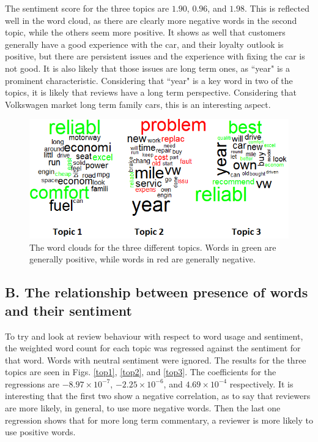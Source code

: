 \documentclass[onecolumn,prl,aps,10pt]{revtex4}
\begin{document}
The sentiment score for the three topics are $1.90$, $0.96$, and $1.98$. This is reflected well in the word cloud, as there are clearly more negative words in the second topic, while the others seem more positive. It shows as well that customers generally have a good experience with the car, and their loyalty outlook is positive, but there are persistent issues and the experience with fixing the car is not good. It is also likely that those issues are long term ones, as \textquotedblleft year" is a prominent characteristic. Considering that \textquotedblleft year" is a key word in two of the topics, it is likely that reviews have a long term perspective. Considering that Volkswagen market long term family cars, this is an interesting aspect.

\begin{figure}
\includegraphics*[clip]{all_clouds.png}
\caption{The word clouds for the three different topics. Words in green are generally positive, while words in red are generally negative.} \label{clouds}
\end{figure}


\subsection{B. The relationship between presence of words and their sentiment}

To try and look at review behaviour with respect to word usage and sentiment, the weighted word count for each topic was regressed against the sentiment for that word. Words with neutral sentiment were ignored. The results for the three topics are seen in Figs. \ref{top1}, \ref{top2}, and \ref{top3}. The coefficients for the regressions are $-8.97 \times 10^{-7}$, $-2.25 \times 10^{-6}$, and $4.69 \times 10^{-4}$ respectively. It is interesting that the first two show a negative correlation, as to say that reviewers are more likely, in general, to use more negative words. Then the last one regression shows that for more long term commentary, a reviewer is more likely to use positive words.
\end{document}
